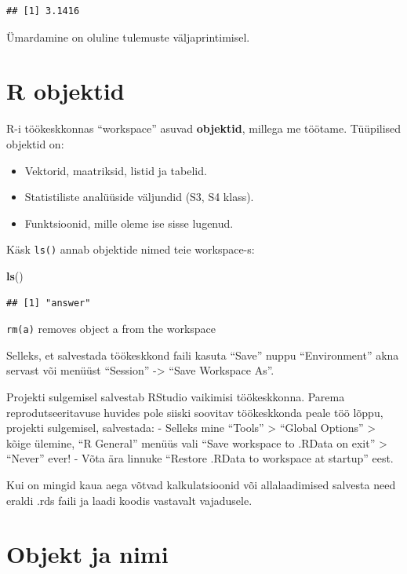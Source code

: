 \documentclass[]{book}
\newenvironment{Shaded}{\begin{snugshade}}{\end{snugshade}}
\newcommand{\KeywordTok}[1]{\textcolor[rgb]{0.13,0.29,0.53}{\textbf{#1}}}
\newcommand{\NormalTok}[1]{#1}
\providecommand{\tightlist}{%
  \setlength{\itemsep}{0pt}\setlength{\parskip}{0pt}}
\begin{document}
\begin{verbatim}
## [1] 3.1416
\end{verbatim}

Ümardamine on oluline tulemuste väljaprintimisel.

\section{R objektid}\label{r-objektid}

R-i töökeskkonnas ``workspace'' asuvad \textbf{objektid}, millega me
töötame. Tüüpilised objektid on:

\begin{itemize}
\tightlist
\item
  Vektorid, maatriksid, listid ja tabelid.
\item
  Statistiliste analüüside väljundid (S3, S4 klass).
\item
  Funktsioonid, mille oleme ise sisse lugenud.
\end{itemize}

Käsk \texttt{ls()} annab objektide nimed teie workspace-s:

\begin{Shaded}
\begin{Highlighting}[]
\KeywordTok{ls}\NormalTok{()}
\end{Highlighting}
\end{Shaded}

\begin{verbatim}
## [1] "answer"
\end{verbatim}

\texttt{rm(a)} removes object a from the workspace

Selleks, et salvestada töökeskkond faili kasuta ``Save'' nuppu
``Environment'' akna servast või menüüst ``Session'' -\textgreater{}
``Save Workspace As''.

Projekti sulgemisel salvestab RStudio vaikimisi töökeskkonna. Parema
reprodutseeritavuse huvides pole siiski soovitav töökeskkonda peale töö
lõppu, projekti sulgemisel, salvestada: - Selleks mine ``Tools''
\textgreater{} ``Global Options'' \textgreater{} kõige ülemine, ``R
General'' menüüs vali ``Save workspace to .RData on exit''
\textgreater{} ``Never'' ever! - Võta ära linnuke ``Restore .RData to
workspace at startup'' eest.

Kui on mingid kaua aega võtvad kalkulatsioonid või allalaadimised
salvesta need eraldi .rds faili ja laadi koodis vastavalt vajadusele.

\section{Objekt ja nimi}\label{objekt-ja-nimi}
\end{document}
